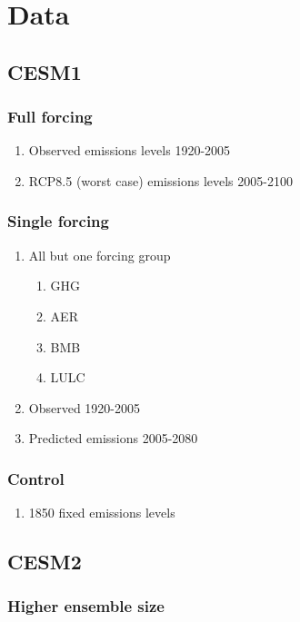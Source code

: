 \documentclass[11pt]{article}
\begin{document}
\section{Data}
\label{sec:orgf91b064}
\subsection{CESM1}
\label{sec:orgdbe1af7}
\subsubsection{Full forcing}
\label{sec:org36a19d8}
\begin{enumerate}
\item Observed emissions levels 1920-2005
\label{sec:orgb6bc9c1}
\item RCP8.5 (worst case) emissions levels 2005-2100
\label{sec:org33be126}
\end{enumerate}
\subsubsection{Single forcing}
\label{sec:org7605e03}
\begin{enumerate}
\item All but one forcing group
\label{sec:org5ca7629}
\begin{enumerate}
\item GHG
\label{sec:org0bfc156}
\item AER
\label{sec:org1fc732e}
\item BMB
\label{sec:org31cca4f}
\item LULC
\label{sec:orgad3afc0}
\end{enumerate}
\item Observed 1920-2005
\label{sec:orgfc27146}
\item Predicted emissions 2005-2080
\label{sec:orgcd0ade9}
\end{enumerate}
\subsubsection{Control}
\label{sec:org3521a66}
\begin{enumerate}
\item 1850 fixed emissions levels
\label{sec:org78d4232}
\end{enumerate}
\subsection{CESM2}
\label{sec:org903fc5c}
\subsubsection{Higher ensemble size}
\label{sec:orgfa93ce4}
\end{document}
